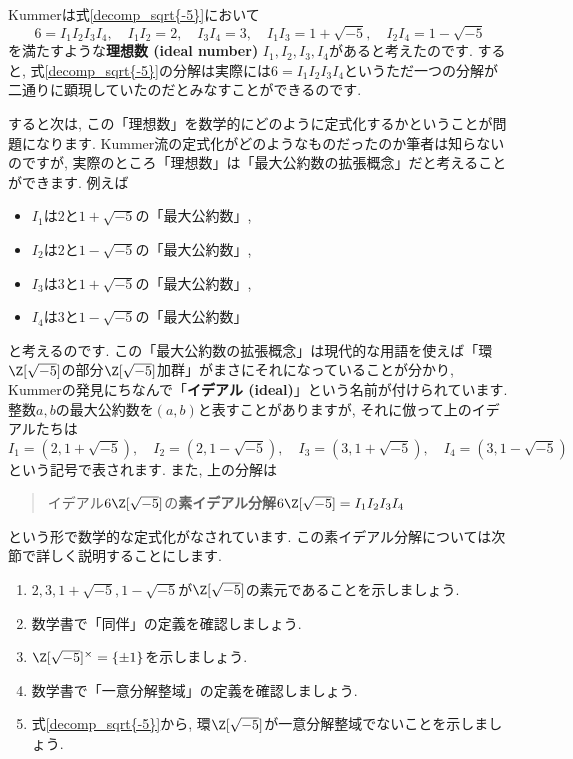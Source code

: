\documentclass[11pt,b5paper,oneside,titlepage,lualatex]{ltjsreport}
\numberwithin{equation}{section} %
\begin{document}
Kummerは式\eqref{decomp_sqrt{-5}}において
\[
6 = I_1 I_2 I_3 I_4, \quad
I_1 I_2 = 2, \quad
I_3 I_4 = 3, \quad
I_1 I_3 = 1 + \sqrt{-5}, \quad
I_2 I_4 = 1 - \sqrt{-5}
\]
を満たすような\textbf{理想数 (ideal number)} $ I_1, I_2, I_3, I_4 $があると考えたのです. 
すると, 式\eqref{decomp_sqrt{-5}}の分解は実際には$ 6 = I_1 I_2 I_3 I_4 $というただ一つの分解が二通りに顕現していたのだとみなすことができるのです. 

すると次は, この「理想数」を数学的にどのように定式化するかということが問題になります.
Kummer流の定式化がどのようなものだったのか筆者は知らないのですが, 実際のところ「理想数」は「最大公約数の拡張概念」だと考えることができます. 
例えば
\begin{itemize}
	\item $ I_1 $は$ 2 $と$ 1 + \sqrt{-5} $の「最大公約数」, 
	\item $ I_2 $は$ 2 $と$ 1 - \sqrt{-5} $の「最大公約数」, 
	\item $ I_3 $は$ 3 $と$ 1 + \sqrt{-5} $の「最大公約数」, 
	\item $ I_4 $は$ 3 $と$ 1 - \sqrt{-5} $の「最大公約数」
\end{itemize}
と考えるのです. 
この「最大公約数の拡張概念」は現代的な用語を使えば「環$ \Z[\sqrt{-5}] $の部分$ \Z[\sqrt{-5}] $加群」がまさにそれになっていることが分かり, Kummerの発見にちなんで「\textbf{イデアル (ideal)}」という名前が付けられています. 
整数$ a, b $の最大公約数を$ (a, b) $と表すことがありますが, それに倣って上のイデアルたちは
\[
I_1 = (2, 1 + \sqrt{-5} ), \quad
I_2 = (2, 1 - \sqrt{-5}), \quad
I_3 = (3, 1 + \sqrt{-5}), \quad
I_4 = (3, 1 - \sqrt{-5})
\]
という記号で表されます. 
また, 上の分解は
\begin{quote}
	\centering
	イデアル$ 6 \Z[\sqrt{-5}] $の\textbf{素イデアル分解}$ 6 \Z[\sqrt{-5}] = I_1 I_2 I_3 I_4 $
\end{quote}
という形で数学的な定式化がなされています. 
この素イデアル分解については次節で詳しく説明することにします. 

\begin{exc}{}{}
	\begin{enumerate}
		\item $ 2, 3, 1 + \sqrt{-5}, 1 - \sqrt{-5} $が$ \Z[\sqrt{-5}] $の素元であることを示しましょう. 
		\item 数学書で「同伴」の定義を確認しましょう. 
		\item $ \Z[\sqrt{-5}]^\times = \{ \pm 1 \} $を示しましょう. 
		\item 数学書で「一意分解整域」の定義を確認しましょう. 
		\item 式\eqref{decomp_sqrt{-5}}から, 環$ \Z[\sqrt{-5}] $が一意分解整域でないことを示しましょう. 
	\end{enumerate}
\end{exc}
\end{document}
